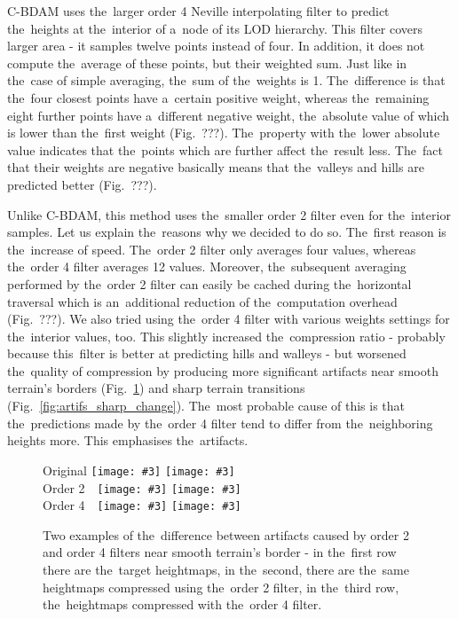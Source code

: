 C-BDAM uses the~larger order 4 Neville interpolating filter to predict the~heights at the~interior of a~node of its LOD hierarchy. This filter covers larger area - it samples twelve points instead of four. In addition, it does not compute the~average of these points, but their weighted sum. Just like in the~case of simple averaging, the~sum of the~weights is 1. The~difference is that the~four closest points have a~certain positive weight, whereas the~remaining eight further points have a~different negative weight, the~absolute value of which is lower than the~first weight (Fig.~???). The~property with the~lower absolute value indicates that the~points which are further affect the~result less. The~fact that their weights are negative basically means that the~valleys and hills are predicted better (Fig.~???). 

Unlike C-BDAM, this method uses the~smaller order 2 filter even for the~interior samples. Let us explain the~reasons why we decided to do so. The~first reason is the~increase of speed. The~order 2 filter only averages four values, whereas the~order 4 filter averages 12 values. Moreover, the~subsequent averaging performed by the~order 2 filter can easily be cached during the~horizontal traversal which is an~additional reduction of the~computation overhead (Fig.~???). We also tried using the~order 4 filter with various weights settings for the~interior values, too. This slightly increased the~compression ratio - probably because this~filter is better at predicting hills and walleys - but worsened the~quality of compression by producing more significant artifacts near smooth terrain's borders (Fig.~\ref{fig:artifs_border}) and sharp terrain transitions (Fig.~\ref{fig:artifs_sharp_change}). The~most probable cause of this is that the~predictions made by the~order 4 filter tend to differ from the~neighboring heights more. This emphasises the~artifacts.

\newcommand{\incimg}[3]{\texttt{[image: \#3]}}
\newcommand{\incartifborder}[1]{\incimg{95}{70}{#1}}

\begin{figure}
	Original \incartifborder{figures/artif_orig0.png}
	\incartifborder{figures/artif_orig1.png}\\
	Order 2~~\incartifborder{figures/artif_four0.png}
	\incartifborder{figures/artif_four1.png}\\
	Order 4~~\incartifborder{figures/artif_twelve0.png}
	\incartifborder{figures/artif_twelve1.png}\\
	\caption{Two examples of the~difference between artifacts caused by order 2 and order 4 filters near smooth terrain's border - in the~first row there are the~target heightmaps, in the~second, there are the~same heightmaps compressed using the~order 2 filter, in the~third row, the~heightmaps compressed with the~order 4 filter.}
	\label{fig:artifs_border}
\end{figure}

